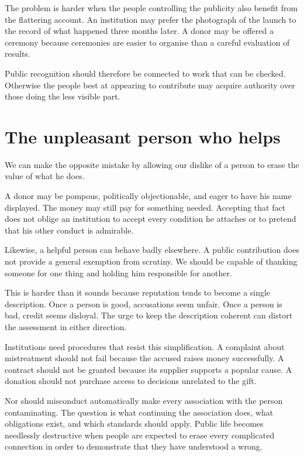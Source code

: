\documentclass[12pt,a4paper]{book}
\begin{document}
The problem is harder when the people controlling the publicity also benefit from the flattering account. An institution may prefer the photograph of the launch to the record of what happened three months later. A donor may be offered a ceremony because ceremonies are easier to organise than a careful evaluation of results.

Public recognition should therefore be connected to work that can be checked. Otherwise the people best at appearing to contribute may acquire authority over those doing the less visible part.

\section*{The unpleasant person who helps}

We can make the opposite mistake by allowing our dislike of a person to erase the value of what he does.

A donor may be pompous, politically objectionable, and eager to have his name displayed. The money may still pay for something needed. Accepting that fact does not oblige an institution to accept every condition he attaches or to pretend that his other conduct is admirable.

Likewise, a helpful person can behave badly elsewhere. A public contribution does not provide a general exemption from scrutiny. We should be capable of thanking someone for one thing and holding him responsible for another.

This is harder than it sounds because reputation tends to become a single description. Once a person is good, accusations seem unfair. Once a person is bad, credit seems disloyal. The urge to keep the description coherent can distort the assessment in either direction.

Institutions need procedures that resist this simplification. A complaint about mistreatment should not fail because the accused raises money successfully. A contract should not be granted because its supplier supports a popular cause. A donation should not purchase access to decisions unrelated to the gift.

Nor should misconduct automatically make every association with the person contaminating. The question is what continuing the association does, what obligations exist, and which standards should apply. Public life becomes needlessly destructive when people are expected to erase every complicated connection in order to demonstrate that they have understood a wrong.
\end{document}
